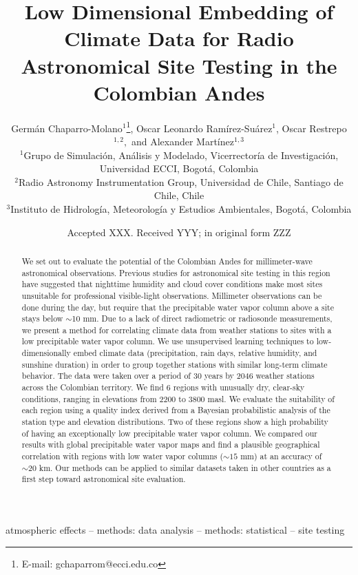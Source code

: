 \documentclass[a4paper,fleqn,usenatbib]{mnras}
\title[Embedding of Climate Data for Site Testing]{Low Dimensional Embedding of Climate Data for Radio Astronomical Site Testing in the Colombian Andes}
\author[G. Chaparro-Molano et al.]{Germ\'an Chaparro-Molano$^{1}$\thanks{E-mail: gchaparrom@ecci.edu.co},
Oscar Leonardo Ram\'irez-Su\'arez$^{1}$,
Oscar Restrepo$^{1,2},$\newauthor
and Alexander Mart\'inez$^{1,3}$\newauthor \\
$^{1}$Grupo de Simulaci\'on, An\'alisis y Modelado, Vicerrector\'ia de Investigaci\'on, Universidad ECCI, Bogot\'a, Colombia\\
$^{2}$Radio Astronomy Instrumentation Group, Universidad de Chile, Santiago de Chile, Chile\\
$^{3}$Instituto de Hidrolog\'ia, Meteorolog\'ia y Estudios Ambientales, Bogot\'a, Colombia
}
\date{Accepted XXX. Received YYY; in original form ZZZ}
\begin{document}
\label{firstpage}
\pagerange{\pageref{firstpage}--\pageref{lastpage}}
\maketitle

\begin{abstract}
We set out to evaluate the potential of the Colombian Andes for millimeter-wave astronomical observations. Previous studies for astronomical site testing in this region have suggested that nighttime humidity and cloud cover conditions make most sites unsuitable for professional visible-light observations. Millimeter observations can be done during the day, but require that the precipitable water vapor column above a site stays below $\sim$10 mm. Due to a lack of direct radiometric or radiosonde measurements, we present a method for correlating climate data from weather stations to sites with a low precipitable water vapor column. We use unsupervised learning techniques to low-dimensionally embed climate data (precipitation, rain days, relative humidity, and sunshine duration) in order to group together stations with similar long-term climate behavior. The data were taken over a period of 30 years by 2046 weather stations across the Colombian territory. We find 6 regions with unusually dry, clear-sky conditions, ranging in elevations from 2200 to 3800 masl. We evaluate the suitability of each region using a quality index derived from a Bayesian probabilistic analysis of the station type and elevation distributions. Two of these regions show a high probability of having an exceptionally low precipitable water vapor column. We compared our results with global precipitable water vapor maps and find a plausible geographical correlation with regions with low water vapor columns ($\sim15$ mm) at an accuracy of $\sim20$ km. Our methods can be applied to similar datasets taken in other countries as a first step toward astronomical site evaluation.


\end{abstract}

\begin{keywords}
atmospheric effects -- methods: data analysis -- methods: statistical -- site testing
\end{keywords}


\end{document}
